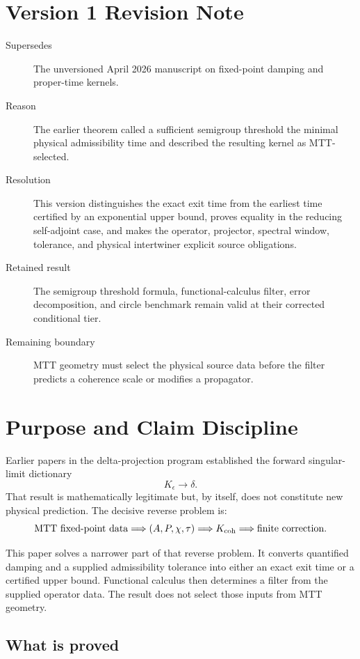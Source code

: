 \documentclass[11pt]{article}
\begin{document}
\section*{Version 1 Revision Note}
\begin{description}
\item[Supersedes] The unversioned April 2026 manuscript on fixed-point damping and
proper-time kernels.
\item[Reason] The earlier theorem called a sufficient semigroup threshold the minimal
physical admissibility time and described the resulting kernel as MTT-selected.
\item[Resolution] This version distinguishes the exact exit time from the earliest time
certified by an exponential upper bound, proves equality in the reducing self-adjoint case,
and makes the operator, projector, spectral window, tolerance, and physical intertwiner
explicit source obligations.
\item[Retained result] The semigroup threshold formula, functional-calculus filter, error
decomposition, and circle benchmark remain valid at their corrected conditional tier.
\item[Remaining boundary] MTT geometry must select the physical source data before the
filter predicts a coherence scale or modifies a propagator.
\end{description}

\section{Purpose and Claim Discipline}

Earlier papers in the delta-projection program established the forward singular-limit dictionary
\[
K_\epsilon \longrightarrow \delta .
\]
That result is mathematically legitimate but, by itself, does not constitute new physical prediction. The decisive reverse problem is:
\[
\text{MTT fixed-point data}
\Longrightarrow
(A,P,\chi,\tau)
\Longrightarrow
K_{\rm coh}
\Longrightarrow
\text{finite correction}.
\]

This paper solves a narrower part of that reverse problem. It converts quantified damping and a supplied admissibility tolerance into either an exact exit time or a certified upper bound. Functional calculus then determines a filter from the supplied operator data. The result does not select those inputs from MTT geometry.

\subsection*{What is proved}
\end{document}
